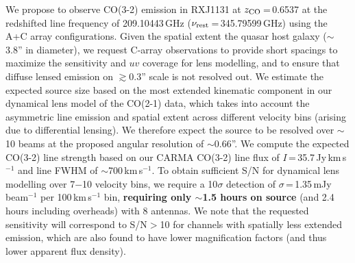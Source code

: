 \documentclass[11pt,a4paper,twoside,graphicx,color]{article}
\newcommand{\bco}{\mbox{CO(2-1)}\xspace}
\newcommand{\cco}{\mbox{CO(3-2)}\xspace}
\newcommand{\kms}{km\,s$^{-1}$\xspace}
\newcommand{\pmOne}{\mbox{$^{-1}$}\xspace}
\newcommand{\eq}{\,=\,}
\newcommand{\obs}{observations\xspace}
\begin{document}
\vspace{.2em}
We propose to observe \cco emission in RXJ1131 at $z_{\rm CO}$\eq0.6537 at the 
redshifted line frequency of 209.10443\,GHz ($\nu_{\rm rest}$\eq345.79599\,GHz) using the A+C array configurations. 
Given the spatial extent the quasar host galaxy ($\sim$3.8'' in diameter), 
we request C-array \obs to provide short spacings 
to maximize the sensitivity and $uv$ coverage for lens modelling, and to
ensure that diffuse lensed emission on $\gtrsim$0.3'' scale is not resolved out. %
We estimate the expected source size based on the
most extended kinematic component in our dynamical lens model of the \bco data, which takes into account the asymmetric line emission and spatial extent across different velocity bins (arising due to differential lensing).
We therefore expect the source to be resolved over $\sim$10 beams at the proposed angular resolution of $\sim$0.66''.
We compute the expected \cco line strength based on our 
CARMA \cco line flux of $I$\eq35.7\,Jy\,\kms and line FWHM of $\sim$700\,\kms.
To obtain sufficient S/N for dynamical lens modelling over 7$-$10 velocity bins, 
we require a 10$\sigma$ detection of $\sigma$\eq1.35\,mJy\,beam\pmOne per 100\,\kms bin,
{\bf requiring only $\sim$1.5 hours on source} (and 2.4 hours including overheads) with 8 antennas.
We note that the requested sensitivity will correspond to S/N$>$10 for channels with spatially less extended emission, which are also found to have lower magnification factors (and thus lower apparent flux density). 

\clearpage
\end{document}
